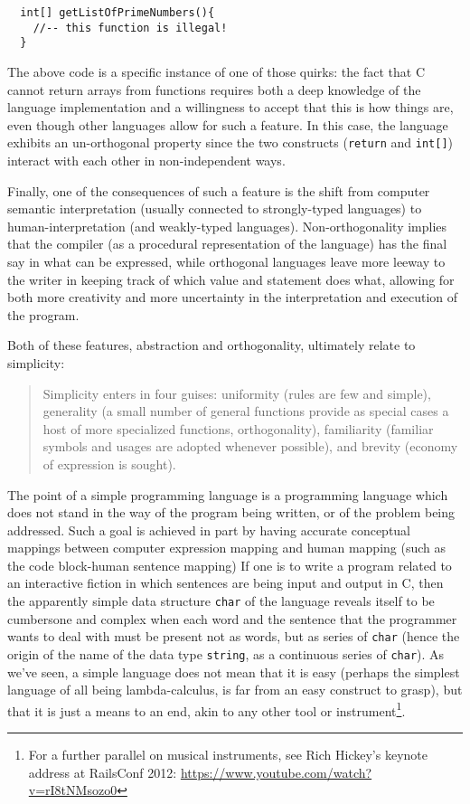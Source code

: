 \begin{lstlisting}
  int[] getListOfPrimeNumbers(){
    //-- this function is illegal!
  }
\end{lstlisting}

The above code is a specific instance of one of those quirks: the fact that C cannot return arrays from functions requires both a deep knowledge of the language implementation and a willingness to accept that this is how things are, even though other languages allow for such a feature. In this case, the language exhibits an un-orthogonal property since the two constructs (\lstinline{return} and \lstinline{int[]}) interact with each other in non-independent ways.

Finally, one of the consequences of such a feature is the shift from computer semantic interpretation (usually connected to strongly-typed languages) to human-interpretation (and weakly-typed languages). Non-orthogonality implies that the compiler (as a procedural representation of the language) has the final say in what can be expressed, while orthogonal languages leave more leeway to the writer in keeping track of which value and statement does what, allowing for both more creativity and more uncertainty in the interpretation and execution of the program.

Both of these features, abstraction and orthogonality, ultimately relate to simplicity:

\begin{quote}
  Simplicity enters in four guises: uniformity (rules are few and simple), generality (a small number of general functions provide as special cases a host of more specialized functions, orthogonality), familiarity (familiar symbols and usages are adopted whenever possible), and brevity (economy of ex­pression is sought).\citep{stansifer_study_1994}
\end{quote}

The point of a simple programming language is a programming language which does not stand in the way of the program being written, or of the problem being addressed. Such a goal is achieved in part by having accurate conceptual mappings between computer expression mapping and human mapping (such as the code block-human sentence mapping\citep{fedorenko_language_2019}) If one is to write a program related to an interactive fiction in which sentences are being input and output in C, then the apparently simple data structure \lstinline{char} of the language reveals itself to be cumbersone and complex when each word and the sentence that the programmer wants to deal with must be present not as words, but as series of \lstinline{char} (hence the origin of the name of the data type \lstinline{string}, as a continuous series of \lstinline{char}). As we've seen, a simple language does not mean that it is easy (perhaps the simplest language of all being lambda-calculus, is far from an easy construct to grasp), but that it is just a means to an end, akin to any other tool or instrument\footnote{For a further parallel on musical instruments, see Rich Hickey's keynote address at RailsConf 2012: \url{https://www.youtube.com/watch?v=rI8tNMsozo0}}.

